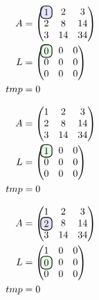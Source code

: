 \documentclass[aspectratio=169,hyperref={pdfpagelabels=false}]{beamer}
\begin{document}
\begin{frame}
    \begin{align*}
        A &= \begin{pmatrix}
            \hlight{1} &  2 & 3\\
            2 &  8 & 14\\
            3 & 14 & 34
        \end{pmatrix}\\
        L &= \begin{pmatrix}
            \tocalculate{0} & 0 & 0\\
            0 & 0 & 0\\
            0 & 0 & 0
        \end{pmatrix}\\
        tmp &= 0
    \end{align*}
\end{frame}
\begin{frame}
    \begin{align*}
        A &= \begin{pmatrix}
            1 &  2 & 3\\
            2 &  8 & 14\\
            3 & 14 & 34
        \end{pmatrix}\\
        L &= \begin{pmatrix}
            \tocalculate{1} & 0 & 0\\
            0 & 0 & 0\\
            0 & 0 & 0
        \end{pmatrix}\\
        tmp &= 0
    \end{align*}
\end{frame}
\begin{frame}
    \begin{align*}
        A &= \begin{pmatrix}
            1 &  2 & 3\\
            \hlight{2} &  8 & 14\\
            3 & 14 & 34
        \end{pmatrix}\\
        L &= \begin{pmatrix}
            1 & 0 & 0\\
            \tocalculate{0} & 0 & 0\\
            0 & 0 & 0
        \end{pmatrix}\\
        tmp &= 0
    \end{align*}
\end{frame}
\end{document}
